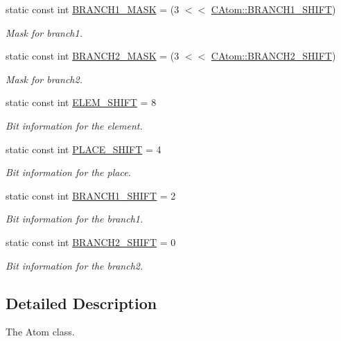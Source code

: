 \begin{DoxyCompactItemize}
static const int \hyperlink{classCAtom_a0abe41c8fd1d3c1d0a19cad9e44427b1}{B\-R\-A\-N\-C\-H1\-\_\-\-M\-A\-S\-K} = (3 $<$$<$ \hyperlink{classCAtom_a1681cf237fc69b41f3cd19883b0d95f9}{C\-Atom\-::\-B\-R\-A\-N\-C\-H1\-\_\-\-S\-H\-I\-F\-T})
\begin{DoxyCompactList}\small\item\em Mask for branch1. \end{DoxyCompactList}\item 
static const int \hyperlink{classCAtom_a5c11499e3e68349fd7e83369a5939319}{B\-R\-A\-N\-C\-H2\-\_\-\-M\-A\-S\-K} = (3 $<$$<$ \hyperlink{classCAtom_a1932c279f682ca9a43d653ec5afae175}{C\-Atom\-::\-B\-R\-A\-N\-C\-H2\-\_\-\-S\-H\-I\-F\-T})
\begin{DoxyCompactList}\small\item\em Mask for branch2. \end{DoxyCompactList}\item 
static const int \hyperlink{classCAtom_a8d1a901dcaeab90596ffacac7bc04f3d}{E\-L\-E\-M\-\_\-\-S\-H\-I\-F\-T} = 8
\begin{DoxyCompactList}\small\item\em Bit information for the element. \end{DoxyCompactList}\item 
static const int \hyperlink{classCAtom_a86677e582ce1bbdd16d6af1807804aa0}{P\-L\-A\-C\-E\-\_\-\-S\-H\-I\-F\-T} = 4
\begin{DoxyCompactList}\small\item\em Bit information for the place. \end{DoxyCompactList}\item 
static const int \hyperlink{classCAtom_a1681cf237fc69b41f3cd19883b0d95f9}{B\-R\-A\-N\-C\-H1\-\_\-\-S\-H\-I\-F\-T} = 2
\begin{DoxyCompactList}\small\item\em Bit information for the branch1. \end{DoxyCompactList}\item 
static const int \hyperlink{classCAtom_a1932c279f682ca9a43d653ec5afae175}{B\-R\-A\-N\-C\-H2\-\_\-\-S\-H\-I\-F\-T} = 0
\begin{DoxyCompactList}\small\item\em Bit information for the branch2. \end{DoxyCompactList}\end{DoxyCompactItemize}


\subsection{Detailed Description}
The Atom class. 

